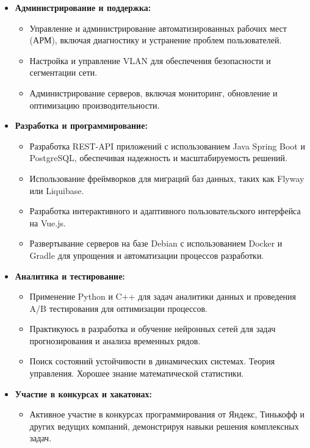 \documentclass[a4paper,10pt]{article}
\begin{document}
\begin{itemize}
    \item \textbf{Администрирование и поддержка:}
    \begin{itemize}
        \item Управление и администрирование автоматизированных рабочих мест (АРМ), включая диагностику и устранение проблем пользователей.
        \item Настройка и управление VLAN для обеспечения безопасности и сегментации сети.
        \item Администрирование серверов, включая мониторинг, обновление и оптимизацию производительности.
    \end{itemize}

    \item \textbf{Разработка и программирование:}
    \begin{itemize}
        \item Разработка REST-API приложений с использованием Java Spring Boot и PostgreSQL, обеспечивая надежность и масштабируемость решений.
        \item Использование фреймворков для миграций баз данных, таких как Flyway или Liquibase.
        \item Разработка интерактивного и адаптивного пользовательского интерфейса на Vue.js.
        \item Развертывание серверов на базе Debian с использованием Docker и Gradle для упрощения и автоматизации процессов разработки.
    \end{itemize}

    \item \textbf{Аналитика и тестирование:}
    \begin{itemize}
        \item Применение Python и C++ для задач аналитики данных и проведения A/B тестирования для оптимизации процессов.
        \item Практикуюсь в разработка и обучение нейронных сетей для задач прогнозирования и анализа временных рядов.
        \item Поиск состояний устойчивости в динамических системах. Теория управления. Хорошее знание математической статистики. 
    \end{itemize}

    \item \textbf{Участие в конкурсах и хакатонах:}
    \begin{itemize}
        \item Активное участие в конкурсах программирования от Яндекс, Тинькофф и других ведущих компаний, демонстрируя навыки решения комплексных задач.
    \end{itemize}


\end{itemize}
\end{document}
